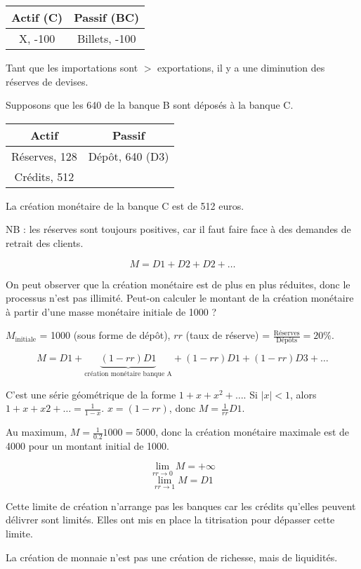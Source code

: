 	\begin{tabular}{c|c}
	Actif (C) & Passif (BC) \\ 
	\hline 
	X, -100 & Billets, -100
	\end{tabular}
	
	Tant que les importations sont $>$ exportations, il y a une diminution des réserves de devises.
	
	
	Supposons que les 640 de la banque B sont déposés à la banque C.
	
	\begin{tabular}{c|c}
	Actif & Passif \\ 
	\hline 
	Réserves, 128 & Dépôt, 640 (D3) \\ 
	Crédits, 512 &  
	\end{tabular} 
	
	La création monétaire de la banque C est de 512 euros.
	
	NB : les réserves sont toujours positives, car il faut faire face à des demandes de retrait des clients.
	
	$$M = D1 + D2 + D2 + \dots$$
	
	On peut observer que la création monétaire est de plus en plus réduites, donc le processus n'est pas illimité. Peut-on calculer le montant de la création monétaire à partir d'une masse monétaire initiale de 1000 ?
	
	$M_{\text{initiale}}$ = 1000 (sous forme de dépôt), $rr$ (taux de réserve) = $\frac{\text{Réserves}}{\text{Dépôts}} = 20\%$.
	
	$$M = D1 + \underbrace{(1 - rr) D1}_{\text{création monétaire banque A}} + (1 - rr) D1 + (1 - rr) D3 + \dots$$
		
	C'est une série géométrique de la forme $1 + x + x^2 + \dots$. Si $\vert x \vert < 1$, alors $1 + x + x2 + \dots = \frac{1}{1 - x}$. $x = (1 - rr)$, donc $M = \frac{1}{rr} D1$.
	
	Au maximum, $M = \frac{1}{0.2} 1000 = 5000$, donc la création monétaire maximale est de 4000 pour un montant initial de 1000.
	
	$$\lim_{rr \rightarrow 0} M = + \infty$$
	$$\lim_{rr \rightarrow 1} M = D1$$
	
	Cette limite de création n'arrange pas les banques car les crédits qu'elles peuvent délivrer sont limités. Elles ont mis en place la titrisation pour dépasser cette limite.
	
	La création de monnaie n'est pas une création de richesse, mais de liquidités.
	
